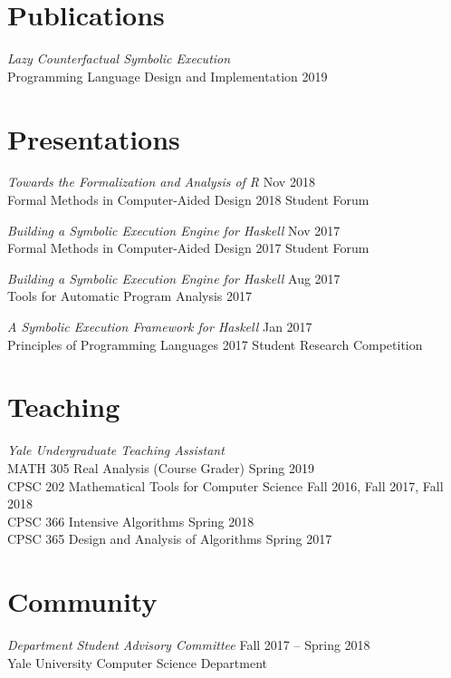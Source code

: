 \documentclass[margin]{res}
\begin{document}
\begin{resume}
\section{Publications}
\textit{Lazy Counterfactual Symbolic Execution} \\
Programming Language Design and Implementation 2019 \\



\section{Presentations}
\textit{Towards the Formalization and Analysis of R}
  \hfill Nov 2018 \\
Formal Methods in Computer-Aided Design 2018 Student Forum

\textit{Building a Symbolic Execution Engine for Haskell}
  \hfill Nov 2017 \\
Formal Methods in Computer-Aided Design 2017 Student Forum

\textit{Building a Symbolic Execution Engine for Haskell}
  \hfill Aug 2017 \\
Tools for Automatic Program Analysis 2017

\textit{A Symbolic Execution Framework for Haskell}
  \hfill Jan 2017 \\
Principles of Programming Languages 2017 Student Research Competition


\section{Teaching}
\textit{Yale Undergraduate Teaching Assistant} \\
  MATH 305 Real Analysis (Course Grader)
    \hfill Spring 2019 \\
  CPSC 202 Mathematical Tools for Computer Science
    \hfill Fall 2016, Fall 2017, Fall 2018 \\
  CPSC 366 Intensive Algorithms
    \hfill Spring 2018 \\
  CPSC 365 Design and Analysis of Algorithms
    \hfill Spring 2017

\section{Community}
\textit{Department Student Advisory Committee}
  \hfill Fall 2017 -- Spring 2018 \\
Yale University Computer Science Department


\end{resume}
\end{document}

